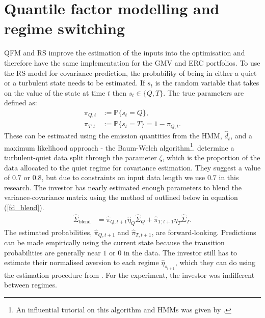 \documentclass[a4paper,11pt,nocenter,bold,noupper,headcount]{mythesis}
\theoremstyle{plain}
\theoremstyle{definition}
\begin{document}
\section{Quantile factor modelling and regime switching}

QFM and RS improve the estimation of the inputs into the optimisation and therefore have the same implementation for the GMV and ERC portfolios. To use the RS model for covariance prediction, the probability of being in either a quiet or a turbulent state needs to be estimated. If $s_t$ is the random variable that takes on the value of the state at time $t$ then $s_t \in \{Q, T\}$. The true parameters are defined as:
\begin{align*}
\pi_{Q, t} &:= \mathbb{P}\{s_t = Q\}, \\
\pi_{T, t} &:= \mathbb{P}\{s_t = T\} = 1 - \pi_{Q, t}.
\end{align*} 
These can be estimated using the emission quantities from the HMM, $\hat{d}_t$, and a maximum likelihood approach - the Baum-Welch algorithm\footnote{An influential tutorial on this algorithm and HMMs was given by \cite{R89}.}.  \cite{K12} determine a turbulent-quiet data split through the parameter $\zeta$, which is the proportion of the data allocated to the quiet regime for covariance estimation. They suggest a value of $0.7$ or $0.8$, but due to constraints on input data length we use $0.7$ in this research. The investor has nearly estimated enough parameters to blend the variance-covariance matrix using the method of \cite{FD18} outlined below in equation (\ref{fd_blend}).
\begin{align} \label{fd_blend}
\hat{\Sigma}_{\text{blend}} & = \hat{\pi}_{Q, t + 1} \hat{\eta}_Q \hat{\Sigma}_Q + \hat{\pi}_{T, t + 1} \hat{\eta}_T \hat{\Sigma}_T.
\end{align}
The estimated probabilities,  $\hat{\pi}_{Q, t + 1}$ and $\hat{\pi}_{T, t + 1}$, are forward-looking. Predictions can be made empirically using the current state because the transition probabilities are generally near $1$ or $0$ in the data. The investor still has to estimate their normalised aversion to each regime $\hat{\eta}_{s_{t+1}}$, which they can do using the estimation procedure from \cite{B18}. For the experiment, the investor was indifferent between regimes.
\end{document}
